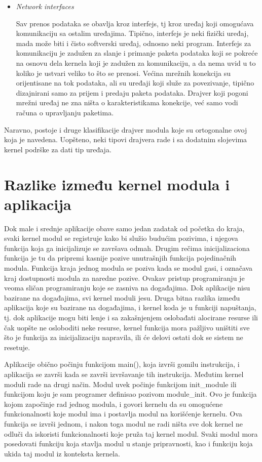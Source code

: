\documentclass[a4paper, 12pt, diplomski]{etf}
\begin{document}
\begin{itemize}
		\pagebreak

		\item \textit{Network interfaces}

	Sav prenos podataka se obavlja kroz interfejs, tj kroz uređaj koji omogućava komunikaciju sa ostalim uređajima. Tipično, interfejs je neki fizički uređaj, mada može biti i čisto softverski uređaj, odnosno neki program. Interfejs za komunikaciju je zadužen za slanje i primanje paketa podataka koji se pokreće na osnovu dela kernela koji je zadužen za komunikaciju, a da nema uvid u to koliko je ustvari veliko to što se prenosi. Većina mrežnih konekcija su orijentisane na tok podataka, ali su uređaji koji služe za povezivanje, tipično dizajnirani samo za prijem i predaju paketa podataka. Drajver koji pogoni mrežni uređaj ne zna ništa o karakteristikama konekcije, već samo vodi računa o upravljanju paketima.

	\end{itemize}

	Naravno, postoje i druge klasifikacije drajver modula koje su ortogonalne ovoj koja je navedena. Uopšteno, neki tipovi drajvera rade i sa dodatnim slojevima kernel podrške za dati tip uređaja.

	\section{Razlike između kernel modula i aplikacija}

	Dok male i srednje aplikacije obave samo jedan zadatak od početka do kraja, svaki kernel modul se registruje kako bi služio budućim pozivima, i njegova funkcija koja ga inicijalizuje se završava odmah. Drugim rečima inicijalizaciona funkcija je tu da pripremi kasnije pozive unutrašnjih funkcija pojedinačnih modula. Funkcija kraja jednog modula se poziva kada se modul gasi, i označava kraj dostupnosti modula za naredne pozive. Ovakav pristup programiranju je veoma sličan programiranju koje se zasniva na događajima. Dok aplikacije nisu bazirane na događajima, svi kernel moduli jesu. Druga bitna razlika između aplikacija koje su bazirane na događajima, i kernel koda je u funkciji napuštanja, tj. dok aplikacije mogu biti lenje i sa zakašnjenjem oslobađati alocirane resurse ili čak uopšte ne osloboditi neke resurse, kernel funkcija mora pažljivo uništiti sve što je funkcija za inicijalizaciju napravila, ili će delovi ostati dok se sistem ne resetuje.

	Aplikacije obično počinju funkcijom main(), koja izvrši gomilu instru\-kci\-ja, i aplikacija se završi kada se završi izvršavanje tih instrukcija. Međutim kernel moduli rade na drugi način. Modul uvek počinje funkcijom init\_module ili funkcijom koju je sam programer definisao  pozivom module\_init. Ovo je funkcija kojom započinje rad jednog modula, i govori kernelu da su omogućene funkcionalnosti koje modul ima i postavlja modul na korišćenje kernelu. Ova funkcija se izvrši jednom, i nakon toga modul ne radi ništa sve dok kernel ne odluči da iskoristi funkcionalnosti koje pruža taj kernel modul. Svaki modul mora posedovati funkciju koja stavlja modul u stanje pripravnosti, kao i funkciju koja ukida taj modul iz konteksta kernela.
\end{document}
